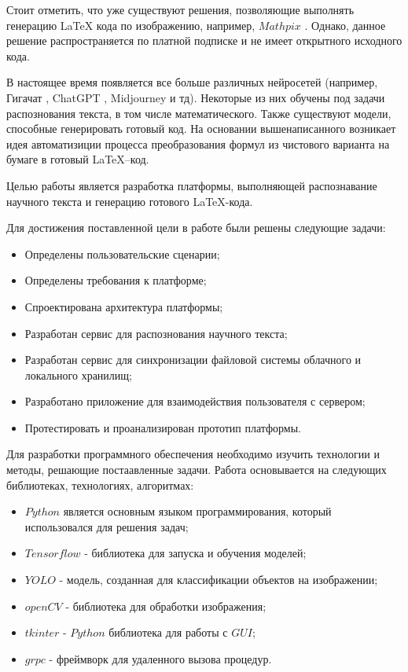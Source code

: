 Стоит отметить, что уже существуют решения, позволяющие выполнять генерацию \LaTeX\; кода по изображению, например, $Mathpix$ \cite{mathpix}. Однако, данное решение распространяется по платной подписке и не имеет открытного исходного кода.

В настоящее время появляется все больше различных нейросетей (например, Гигачат \cite{gigachat}, ChatGPT \cite{chat_gpt}, Midjourney \cite{midjourney} и тд). Некоторые из них обучены под задачи распознования текста, в том числе математического. Также существуют модели, способные генерировать готовый код. 
На основании вышенаписанного возникает идея автоматизиции процесса преобразования формул из чистового варианта на бумаге в готовый  \LaTeX --код.


Целью работы является разработка платформы, выполняющей распознавание научного текста и  генерацию готового \LaTeX-кода.

Для достижения поставленной цели в работе были решены следующие задачи:
\begin{itemize}
    \item Определены пользовательские сценарии;
    \item Определены требования к платформе;
    \item Спроектирована архитектура платформы;
    \item Разработан сервис для распознования научного текста;
    \item Разработан сервис для синхронизации файловой системы облачного и локального хранилищ;
    \item Разработано приложение для взаимодействия пользователя с сервером;
    \item Протестировать и проанализирован прототип платформы.
\end{itemize}

Для разработки программного обеспечения необходимо изучить технологии и методы, решающие постаавленные задачи. Работа основывается на следующих библиотеках, технологиях, алгоритмах:
\begin{itemize}
    \item $Python$ является основным языком программирования, который использовался для решения задач;
    \item $Tensorflow$ - библиотека для запуска и обучения моделей;
    \item $YOLO$ - модель, созданная для классификации объектов на изображении;
    \item $openCV$ - библиотека для обработки изображения;
    \item $tkinter$ - $Python$ библиотека для работы с $GUI$;
    \item $grpc$ - фреймворк для удаленного вызова процедур.
\end{itemize}

